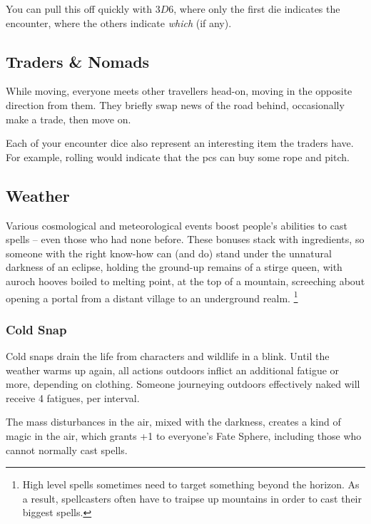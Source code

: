 \begin{multicols}{2}
You can pull this off quickly with $3D6$, where only the first die indicates the encounter, where the others indicate \emph{which} (if any).

\subsection{Traders \& Nomads}

While moving, everyone meets other travellers head-on, moving in the opposite direction from them.
They briefly swap news of the road behind, occasionally make a trade, then move on.

\encTraders

Each of your encounter dice also represent an interesting item the traders have.
For example, rolling  would indicate that the \glspl{pc} can buy some rope and pitch.

\subsection{Weather}
Various cosmological and meteorological events boost people's abilities to cast spells -- even those who had none before.
These bonuses stack with \glspl{ingredient}, so someone with the right know-how can (and do) stand under the unnatural darkness of an eclipse, holding the ground-up remains of a stirge queen, with auroch hooves boiled to melting point, at the top of a mountain, screeching about opening a portal from a distant \gls{village} to an underground realm.%
\footnote{High level spells sometimes need to target something beyond the horizon.
As a result, spellcasters often have to traipse up mountains in order to cast their biggest spells.}

\subsubsection{Cold Snap}

Cold snaps drain the life from characters and wildlife in a blink.
Until the weather warms up again, all actions outdoors inflict an additional \gls{fatigue} or more, depending on clothing.
Someone journeying outdoors effectively naked will receive 4 \glspl{fatigue}, per \gls{interval}.

The mass disturbances in the air, mixed with the darkness, creates a kind of magic in the air, which grants +1 to everyone's Fate Sphere, including those who cannot normally cast spells.


\end{multicols}
